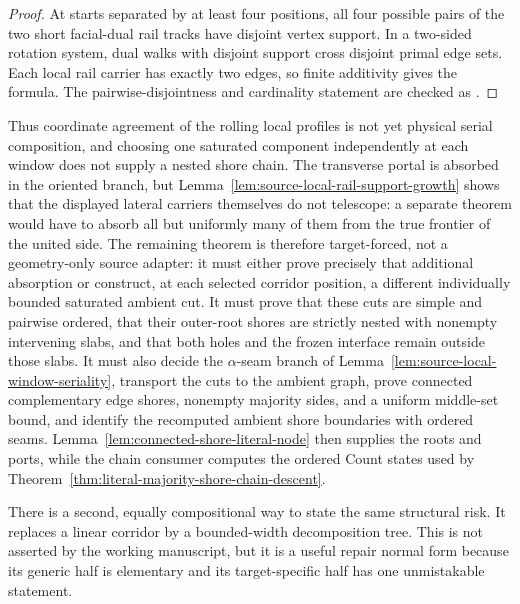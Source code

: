 \begin{proof}
At starts separated by at least four positions, all four possible pairs of
the two short facial-dual rail tracks have disjoint vertex support.  In a
two-sided rotation system, dual walks with disjoint support cross disjoint
primal edge sets.  Each local rail carrier has exactly two edges, so finite
additivity gives the formula.  The pairwise-disjointness and cardinality
statement are checked as
.
\end{proof}

Thus coordinate agreement of the rolling local profiles is not yet physical
serial composition, and choosing one saturated component independently at
each window does not supply a nested shore chain.  The transverse portal is
absorbed in the oriented branch, but
Lemma~\ref{lem:source-local-rail-support-growth} shows that the displayed
lateral carriers themselves do not telescope: a separate theorem would have
to absorb all but uniformly many of them from the true frontier of the united
side.  The remaining theorem is therefore target-forced, not a geometry-only
source adapter: it must either prove precisely that additional absorption or
construct, at each selected corridor position, a different individually
bounded saturated ambient cut.
It must prove that these cuts are simple and pairwise ordered, that their
outer-root shores are strictly nested with nonempty intervening slabs, and
that both holes and the frozen interface remain outside those slabs.  It must
also decide the $\alpha$-seam branch of
Lemma~\ref{lem:source-local-window-seriality}, transport the cuts to the
ambient graph, prove connected complementary edge shores, nonempty majority
sides, and a uniform middle-set bound, and identify the recomputed ambient
shore boundaries with ordered seams.  Lemma~\ref{lem:connected-shore-literal-node}
then supplies the roots and ports, while the chain consumer computes the
ordered Count states used by
Theorem~\ref{thm:literal-majority-shore-chain-descent}.

There is a second, equally compositional way to state the same structural
risk.  It replaces a linear corridor by a bounded-width decomposition tree.
This is not asserted by the working manuscript, but it is a useful repair
normal form because its generic half is elementary and its target-specific
half has one unmistakable statement.

